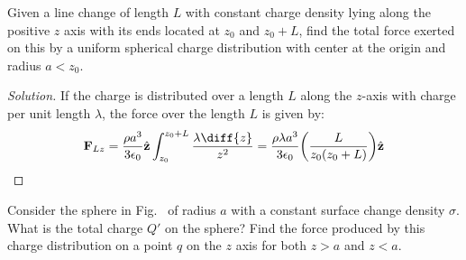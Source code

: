 \documentclass[crop=false,class=article,oneside]{standalone}
\begin{document}
        \begin{problem}[Wangsness 2-7]
            Given a line change of length $L$ with constant charge
            density lying along the positive $z$ axis with its
            ends located at $z_{0}$ and $z_{0}+L$, find the total
            force exerted on this by a uniform spherical charge
            distribution with center at the origin
            and radius $a<z_{0}$.
        \end{problem}
        \begin{proof}[Solution]
            If the charge is distributed over a length $L$
            along the $z$-axis with charge per unit length $\lambda$,
            the force over the length $L$ is given by:
            \begin{equation*}
                \mathbf{F}_{Lz}
                =\frac{\rho a^{3}}{3\epsilon_{0}}\hat{\mathbf{z}}
                \int_{z_{0}}^{z_{0}+L}\frac{\lambda\diff{z}}{z^{2}}
                =\frac{\rho\lambda{a^{3}}}{3\epsilon_{0}}
                \bigg(\frac{L}{z_{0}(z_{0}+L)}\bigg)
                \hat{\mathbf{z}}
            \end{equation*}
        \end{proof}
        \begin{problem}[Wangsness 2-8]
            \label{problem:EMAG_wangsness_2_8}
            Consider the sphere in
            Fig.~
            of radius $a$ with a constant surface change density
            $\sigma$. What is the total charge $Q'$ on the sphere?
            Find the force produced by this charge distribution on a
            point $q$ on the $z$ axis for both $z>a$ and $z<a$.
        \end{problem}
\end{document}
